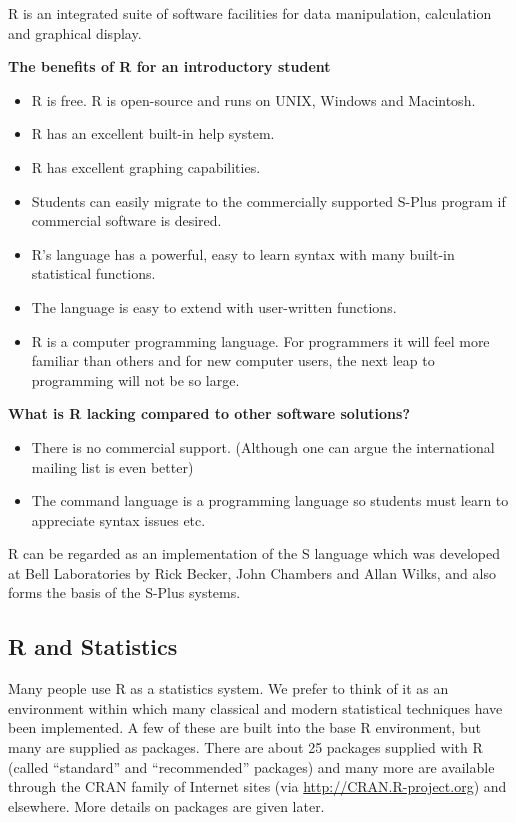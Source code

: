 \documentclass[]{book}
\providecommand{\tightlist}{%
  \setlength{\itemsep}{0pt}\setlength{\parskip}{0pt}}
\begin{document}
R is an integrated suite of software facilities for data manipulation,
calculation and graphical display.

\textbf{The benefits of R for an introductory student}

\begin{itemize}
\tightlist
\item
  R is free. R is open-source and runs on UNIX, Windows and Macintosh.
\item
  R has an excellent built-in help system.
\item
  R has excellent graphing capabilities.
\item
  Students can easily migrate to the commercially supported S-Plus
  program if commercial software is desired.
\item
  R's language has a powerful, easy to learn syntax with many built-in
  statistical functions.
\item
  The language is easy to extend with user-written functions.
\item
  R is a computer programming language. For programmers it will feel
  more familiar than others and for new computer users, the next leap to
  programming will not be so large.
\end{itemize}

\textbf{What is R lacking compared to other software solutions?}

\begin{itemize}
\tightlist
\item
  There is no commercial support. (Although one can argue the
  international mailing list is even better)
\item
  The command language is a programming language so students must learn
  to appreciate syntax issues etc.
\end{itemize}

R can be regarded as an implementation of the S language which was
developed at Bell Laboratories by Rick Becker, John Chambers and Allan
Wilks, and also forms the basis of the S-Plus systems.

\subsection{R and Statistics}\label{r-and-statistics}

Many people use R as a statistics system. We prefer to think of it as an
environment within which many classical and modern statistical
techniques have been implemented. A few of these are built into the base
R environment, but many are supplied as packages. There are about 25
packages supplied with R (called ``standard'' and ``recommended''
packages) and many more are available through the CRAN family of
Internet sites (via \url{http://CRAN.R-project.org}) and elsewhere. More
details on packages are given later.
\end{document}
